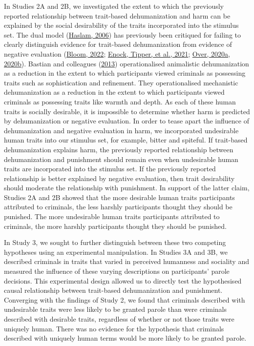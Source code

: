 \documentclass[
]{article}
\begin{document}
In Studies 2A and 2B, we investigated the extent to which the previously reported relationship between trait-based dehumanization and harm can be explained by the social desirability of the traits incorporated into the stimulus set. The dual model (\protect\hyperlink{ref-Haslam2006}{Haslam, 2006}) has previously been critiqued for failing to clearly distinguish evidence for trait-based dehumanization from evidence of negative evaluation (\protect\hyperlink{ref-Bloom2022}{Bloom, 2022}; \protect\hyperlink{ref-Enock2021a}{Enock, Tipper, et al., 2021}; \protect\hyperlink{ref-Over2020a}{Over, 2020a}, \protect\hyperlink{ref-Over2020b}{2020b}). Bastian and colleagues (\protect\hyperlink{ref-Bastian2013}{2013}) operationalised animalistic dehumanization as a reduction in the extent to which participants viewed criminals as possessing traits such as sophistication and refinement. They operationalised mechanistic dehumanization as a reduction in the extent to which participants viewed criminals as possessing traits like warmth and depth. As each of these human traits is socially desirable, it is impossible to determine whether harm is predicted by dehumanization or negative evaluation. In order to tease apart the influence of dehumanization and negative evaluation in harm, we incorporated undesirable human traits into our stimulus set, for example, bitter and spiteful. If trait-based dehumanization explains harm, the previously reported relationship between dehumanization and punishment should remain even when undesirable human traits are incorporated into the stimulus set. If the previously reported relationship is better explained by negative evaluation, then trait desirability should moderate the relationship with punishment. In support of the latter claim, Studies 2A and 2B showed that the more desirable human traits participants attributed to criminals, the less harshly participants thought they should be punished. The more undesirable human traits participants attributed to criminals, the more harshly participants thought they should be punished.

In Study 3, we sought to further distinguish between these two competing hypotheses using an experimental manipulation. In Studies 3A and 3B, we described criminals in traits that varied in perceived humanness and sociality and measured the influence of these varying descriptions on participants' parole decisions. This experimental design allowed us to directly test the hypothesised causal relationship between trait-based dehumanization and punishment. Converging with the findings of Study 2, we found that criminals described with undesirable traits were less likely to be granted parole than were criminals described with desirable traits, regardless of whether or not those traits were uniquely human. There was no evidence for the hypothesis that criminals described with uniquely human terms would be more likely to be granted parole.
\end{document}
